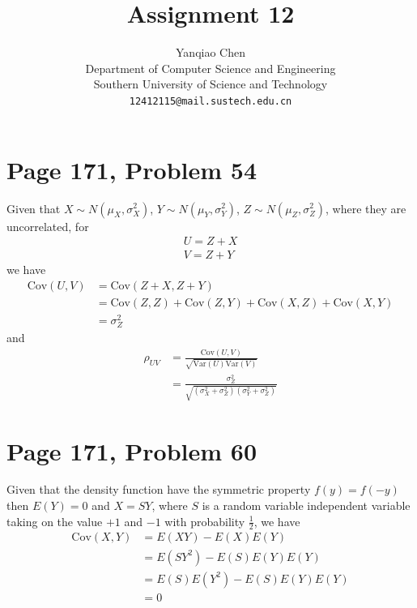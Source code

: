 \documentclass[a4paper, UTF-8]{article}
\theoremstyle{plain}
\begin{document}
\title{\textbf{Assignment 12}}

\author{Yanqiao Chen\\ 
  Department of Computer Science and Engineering\\
  Southern University of Science and Technology\\
  \texttt{12412115@mail.sustech.edu.cn}
  }


\maketitle

\section{Page 171, Problem 54}

Given that $X\sim N(\mu_X, \sigma_X^2)$, $Y\sim N(\mu_Y, \sigma_Y^2)$, $Z \sim N(\mu_Z, \sigma_Z^2)$, where they are uncorrelated, for
\begin{align*}
U = Z + X \\ 
V = Z + Y
\end{align*}
we have
\begin{align*}
\text{Cov}(U, V) & = \text{Cov}(Z + X, Z + Y) \\
& = \text{Cov}(Z, Z) + \text{Cov}(Z, Y) + \text{Cov}(X, Z) + \text{Cov}(X, Y) \\
& = \sigma_Z^2
\end{align*}
and
\begin{align*}
\rho_{UV} & = \frac{\text{Cov}(U, V)}{\sqrt{\text{Var}(U)\text{Var}(V)}} \\
& = \frac{\sigma_Z^2}{\sqrt{(\sigma_X^2 + \sigma_Z^2)(\sigma_Y^2 + \sigma_Z^2)}}
\end{align*}

\section{Page 171, Problem 60} 

Given that the density function have the symmetric property $f(y) = f(-y)$ then $E(Y) = 0$ and $X = SY$, where $S$ is a random variable independent variable taking on the value $+1$ and $-1$ with probability $\frac{1}{2}$, we have
\begin{align*}
\text{Cov}(X, Y) & = E(XY) - E(X)E(Y) \\
& = E(SY^2) - E(S)E(Y)E(Y) \\
& = E(S)E(Y^2) - E(S)E(Y)E(Y) \\
& = 0
\end{align*}
\end{document}

